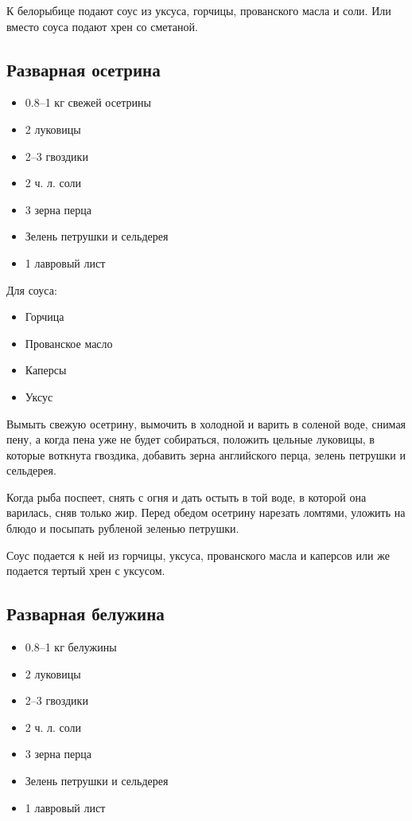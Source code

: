 К белорыбице подают соус из уксуса, горчицы, прованского масла и соли. Или вместо соуса подают хрен со сметаной.

\subsection{Разварная осетрина}

\begin{itemize}
	\item 0.8–1 кг свежей осетрины
    \item 2 луковицы 
    \item 2–3 гвоздики
    \item 2 ч. л. соли
    \item 3 зерна перца
    \item Зелень петрушки и сельдерея 
    \item 1 лавровый лист
\end{itemize}

Для соуса: 

\begin{itemize}
	\item Горчица 
    \item Прованское масло
    \item Каперсы
    \item Уксус
\end{itemize}

Вымыть свежую осетрину, вымочить в холодной и варить в соленой воде, снимая пену, а когда пена уже не будет собираться, положить цельные луковицы, в которые воткнута гвоздика, добавить зерна английского перца, зелень петрушки и сельдерея.

Когда рыба поспеет, снять с огня и дать остыть в той воде, в которой она варилась, сняв только жир. Перед обедом осетрину нарезать ломтями, уложить на блюдо и посыпать рубленой зеленью петрушки.

Соус подается к ней из горчицы, уксуса, прованского масла и каперсов или же подается тертый хрен с уксусом.

\subsection{Разварная белужина}

\begin{itemize}
	\item 0.8–1 кг белужины
    \item 2 луковицы
    \item 2–3 гвоздики
    \item 2 ч. л. соли
    \item 3 зерна перца
    \item Зелень петрушки и сельдерея
    \item 1 лавровый лист
\end{itemize}

